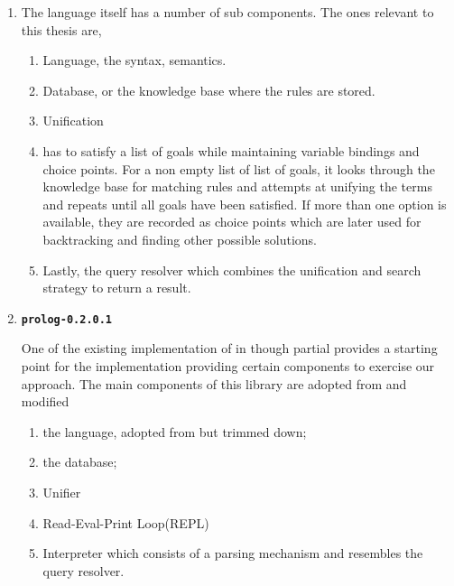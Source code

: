 \documentclass[thesis-solanki.tex]{subfiles}
\providecommand\codeLibrary[1]{\texttt{\bfseries #1}}
\begin{document}
\begin{enumerate}
\item {}

The language itself has a number of sub components.
The ones relevant to this thesis are,
\begin{enumerate}
\item Language, the syntax, semantics.

\item Database, or the knowledge base where the rules are stored.

\item Unification

\item
   has to satisfy a list of goals while maintaining variable bindings and choice points.
  For a non empty list of list of goals, it looks through the knowledge base for matching rules and attempts at
  unifying the terms and repeats until all goals have been satisfied.
  If more than one option is available, they are recorded as choice points which are later used for backtracking
  and finding other possible solutions.

\item
  Lastly, the query resolver which combines the unification and search strategy to return a result.
\end{enumerate}

\item \codeLibrary{prolog-0.2.0.1} \cite{prolog-lib}

  One of the existing implementation of  in  though partial provides a starting
  point for the implementation providing certain components to exercise our approach.
  The main components of this library are adopted from  and modified\yyy{,}{:}

\begin{enumerate}
\item the language, adopted from  but trimmed down;

\item the database;

\item Unifier

\item Read-Eval-Print Loop(REPL)

\item Interpreter which consists of a parsing mechanism and resembles the query resolver.
\end{enumerate}


\end{enumerate}
\end{document}
